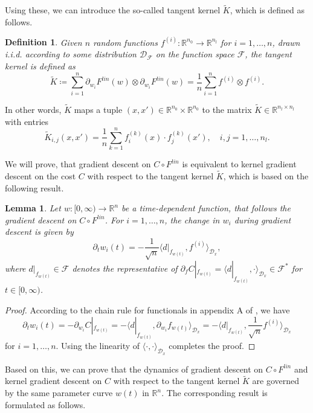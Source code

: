 \documentclass[11pt, a4paper]{article}
\newtheorem{lemma}[theorem]{Lemma}
\newtheorem{definition}[theorem]{Definition}
\newcommand{\R}{\mathbb{R}}
\newcommand{\D}{\mathcal{D}}
\newcommand{\F}{\mathcal{F}}
\begin{document}
Using these, we can introduce the so-called tangent kernel $\tilde{K}$, which is defined as follows.

\begin{definition}
Given $n$ random functions $f^{(i)} : \R^{n_0} \to \R^{n_l}$ for $i=1,\dots,n$, drawn i.i.d. according to some distribution $\D_{\F}$ on the function space $\F$, the tangent kernel is defined as
\[ \tilde{K} \coloneq \sum_{i=1}^{n} \partial_{w_i} F^\textit{lin}(w) \otimes \partial_{w_i} F^\textit{lin}(w) = \frac{1}{n} \sum_{i=1}^{n} f^{(i)} \otimes f^{(i)}. \]
\end{definition}

In other words, $\tilde{K}$ maps a tuple $(x,x') \in \R^{n_0} \times \R^{n_0}$ to the matrix $\tilde{K} \in \R^{n_l \times n_l}$ with entries 
\[ \tilde{K}_{i,j}(x,x') = \frac{1}{n} \sum_{k=1}^{n} f_i^{(k)}(x) \cdot f_j^{(k)}(x'), \quad  i,j=1,\dots,n_l. \]

We will prove, that gradient descent on $C \circ F^\textit{lin}$ is equivalent to kernel gradient descent on the cost $C$ with respect to the tangent kernel $\tilde{K}$, which is based on the following result.

\begin{lemma} \label{lem:evolution}
Let $w: [0, \infty) \to \R^n$ be a time-dependent function, that follows the gradient descent on $C \circ F^\textit{lin}$. For $i=1, \dots, n$, the change in $w_i$ during gradient descent is given by
\[ \partial_tw_i(t) = - \frac{1}{\sqrt{n}} \big \langle d|_{f_{w(t)}}, f^{(i)} \big \rangle_{\D_x}, \]
where $d|_{f_{w(t)}} \in \F$ denotes the representative of $\partial_f C|_{f_{w(t)}} = \big \langle d|_{f_{w(t)}}, \cdot \big \rangle_{\D_x} \in \F^*$ for $t \in [0,\infty)$.
\end{lemma}

\begin{proof}
According to the chain rule for functionals in appendix A of \cite{Functionals}, we have
\[ \partial_tw_i(t) = - \partial_{w_{i}} C|_{f_{w(t)}} = - \big \langle d|_{f_{w(t)}}, \partial_{w_i} f_{w(t)} \big \rangle_{\D_x} = - \big \langle d|_{f_{w(t)}}, \frac{1}{\sqrt{n}} f^{(i)} \big \rangle_{\D_x} \]
for $i = 1, \dots, n$. Using the linearity of $\langle \cdot, \cdot \rangle_{\D_x}$ completes the proof.
\end{proof}

Based on this, we can prove that the dynamics of gradient descent on $C \circ F^\textit{lin}$ and kernel gradient descent on $C$ with respect to the tangent kernel $\tilde{K}$ are governed by the same parameter curve $w(t)$ in $\R^n$. The corresponding result is formulated as follows.
\end{document}
